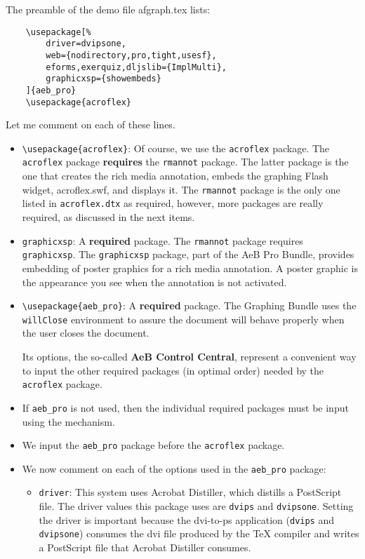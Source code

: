 \documentclass{article}
\begin{document}
The preamble of the demo file afgraph.tex lists:
\begin{verbatim}
    \usepackage[%
        driver=dvipsone,
        web={nodirectory,pro,tight,usesf},
        eforms,exerquiz,dljslib={ImplMulti},
        graphicxsp={showembeds}
    ]{aeb_pro}
    \usepackage{acroflex}
\end{verbatim}
Let me comment on each of these lines.
\begin{itemize}
  \item \verb!\usepackage{acroflex}!: Of course, we use the
  \texttt{acroflex} package. The \texttt{acroflex} package
  \textbf{requires} the \texttt{rmannot} package. The latter package
  is the one that creates the rich media annotation, embeds the
  graphing Flash widget, acroflex.swf, and displays it. The
  \texttt{rmannot} package is the only one listed in
  \texttt{acroflex.dtx} as required, however, more packages are
  really required, as discussed in the next items.

 \item[] \texttt{graphicxsp}: A \textbf{required} package.
  The \texttt{rmannot} package requires \texttt{graphicxsp}. The
  \texttt{graphicxsp} package, part of the AeB Pro Bundle,
  provides embedding of poster graphics for a rich media
  annotation. A poster graphic is the appearance you see when
  the annotation is not activated.

  \item \verb!\usepackage{aeb_pro}!: A \textbf{required} package.
  The {\AcroFLeX} Graphing Bundle uses the \texttt{willClose}
  environment to assure the document will behave properly
  when the user closes the document.

  Its options, the so-called \textbf{AeB Control Central},
  represent a convenient way to input the other required
  packages (in optimal order) needed by the \texttt{acroflex} package.

  \item[] If \texttt{aeb\_pro} is not used, then the individual
  required packages must be input using the 
  mechanism.

  \item[] We input the \texttt{aeb\_pro} package before the
  \texttt{acroflex} package.

  \item[] We now comment on each of the options used in the
  \texttt{aeb\_pro} package:
  \begin{itemize}
    \item \texttt{driver}: This system uses Acrobat Distiller, which
    distills a PostScript file. The driver values this package uses
    are \texttt{dvips} and \texttt{dvipsone}. Setting the driver is
    important because the dvi-to-ps application (\texttt{dvips} and
    \texttt{dvipsone}) consumes the dvi file produced by the {\TeX}
    compiler and writes a PostScript file that Acrobat Distiller
    consumes.


\end{itemize}
\end{itemize}
\end{document}
